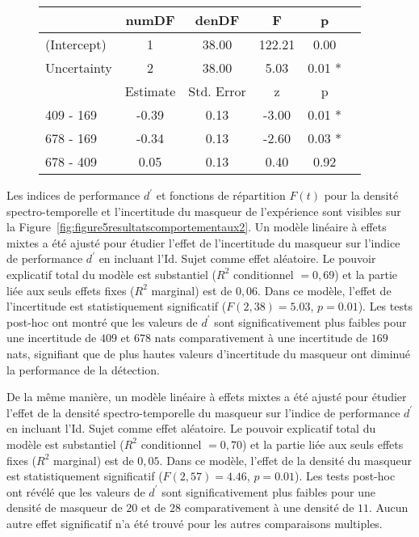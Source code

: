 \begin{figure*}[!t]
\begin{multicols}{2}
\begin{tabular}{|l||*{5}{c|}}
\hline
& numDF & denDF & F & p \\ 
\hline
(Intercept) & 1 & 38.00 & 122.21 & 0.00 \\ 
Uncertainty & 2 & 38.00 & 5.03 & 0.01 *\\ 
\hline
& Estimate & Std. Error & z & p \\ 
\hline
409 - 169 & -0.39 & 0.13 & -3.00 & 0.01 *\\ 
678 - 169 & -0.34 & 0.13 & -2.60 & 0.03 *\\ 
678 - 409 & 0.05 & 0.13 & 0.40 & 0.92 \\ 
\hline
\end{tabular}
\end{multicols}
\end{figure*}

Les indices de performance $d^\prime$ et fonctions de répartition $F(t)$ pour la densité spectro-temporelle et l'incertitude du masqueur de l'expérience sont visibles sur la Figure~\ref{fig:figure5resultatscomportementaux2}. 
Un modèle linéaire à effets mixtes a été ajusté pour étudier l'effet de l'incertitude du masqueur sur l'indice de performance $d^\prime$ en incluant l'Id. Sujet comme effet aléatoire. 
Le pouvoir explicatif total du modèle est substantiel ($R^2$ conditionnel $=0,69$) et la partie liée aux seuls effets fixes ($R^2$ marginal) est de $0,06$. 
Dans ce modèle, l'effet de l'incertitude est statistiquement significatif ($F(2,38)=5.03$, $p=0.01$). 
Les tests post-hoc ont montré que les valeurs de $d^\prime$ sont significativement plus faibles pour une incertitude de $409$ et $678$ nats comparativement à une incertitude de $169$ nats, signifiant que de plus hautes valeurs d'incertitude du masqueur ont diminué la performance de la détection. 

De la même manière, un modèle linéaire à effets mixtes a été ajusté pour étudier l'effet de la densité spectro-temporelle du masqueur sur l'indice de performance $d^\prime$ en incluant l'Id. Sujet comme effet aléatoire. 
Le pouvoir explicatif total du modèle est substantiel ($R^2$ conditionnel $=0,70$) et la partie liée aux seuls effets fixes ($R^2$ marginal) est de $0,05$. 
Dans ce modèle, l'effet de la densité du masqueur est statistiquement significatif ($F(2,57)=4.46$, $p=0.01$). 
Les tests post-hoc ont révélé que les valeurs de $d^\prime$ sont significativement plus faibles pour une densité de masqueur de $20$ et de $28$ comparativement à une densité de $11$.
Aucun autre effet significatif n'a été trouvé pour les autres comparaisons multiples. 

